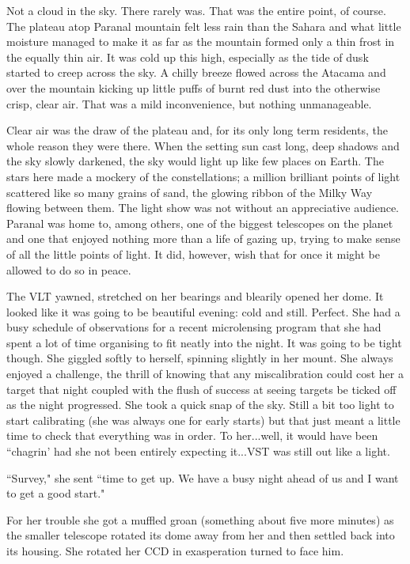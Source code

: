 \documentclass[12pt]{iopart}
\begin{document}
Not a cloud in the sky. There rarely was. That was the entire point, of course. The plateau atop Paranal mountain felt less rain than the Sahara and what little moisture managed to make it as far as the mountain formed only a thin frost in the equally thin air. It was cold up this high, especially as the tide of dusk started to creep across the sky. A chilly breeze flowed across the Atacama and over the mountain kicking up little puffs of burnt red dust into the otherwise crisp, clear air. That was a mild inconvenience, but nothing unmanageable.

Clear air was the draw of the plateau and, for its only long term residents, the whole reason they were there. When the setting sun cast long, deep shadows and the sky slowly darkened, the sky would light up like few places on Earth. The stars here made a mockery of the constellations; a million brilliant points of light scattered like so many grains of sand, the glowing ribbon of the Milky Way flowing between them. The light show was not without an appreciative audience. Paranal was home to, among others, one of the biggest telescopes on the planet and one that enjoyed nothing more than a life of gazing up, trying to make sense of all the little points of light. It did, however, wish that for once it might be allowed to do so in peace.

The VLT yawned, stretched on her bearings and blearily opened her dome. It looked like it was going to be beautiful evening: cold and still. Perfect. She had a busy schedule of observations for a recent microlensing program that she had spent a lot of time organising to fit neatly into the night. It was going to be tight though. She giggled softly to herself, spinning slightly in her mount. She always enjoyed a challenge, the thrill of knowing that any miscalibration could cost her a target that night coupled with the flush of success at seeing targets be ticked off as the night progressed. She took a quick snap of the sky. Still a bit too light to start calibrating (she was always one for early starts) but that just meant a little time to check that everything was in order. To her...well, it would have been ``chagrin' had she not been entirely expecting it...VST was still out like a light.

``Survey," she sent ``time to get up. We have a busy night ahead of us and I want to get a good start."

For her trouble she got a muffled groan (something about five more minutes) as the smaller telescope rotated its dome away from her and then settled back into its housing. She rotated her CCD in exasperation turned to face him.
\end{document}
